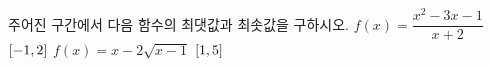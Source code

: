 주어진 구간에서 다음 함수의 최댓값과 최솟값을 구하시오.
 $f(x)=\dfrac{x^2-3x-1}{x+2}$ $[-1{,}\mkern3mu\mathopen{}2]$
 $f(x)=x-2\sqrt{x-1}$ $[1{,}\mkern3mu\mathopen{}5]$
